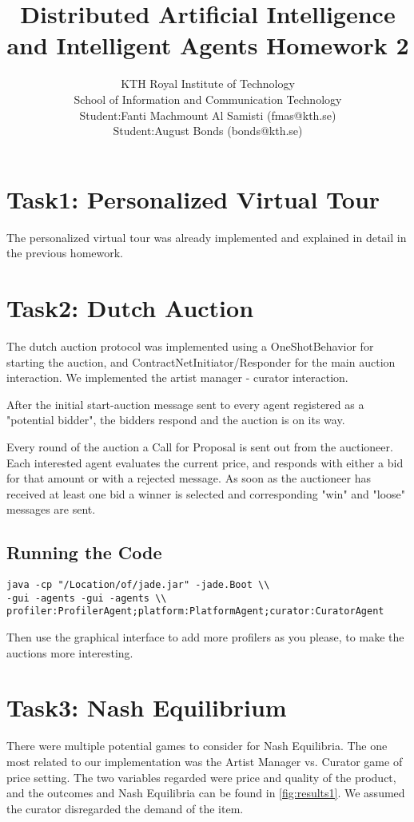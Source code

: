 \documentclass[a4paper, 11pt]{article}
\title{Distributed Artificial Intelligence and Intelligent Agents Homework 2}
\author{KTH Royal Institute of Technology \\ 
		School of Information and Communication Technology \\
		Student:Fanti Machmount Al Samisti (fmas@kth.se) \\
		Student:August Bonds (bonds@kth.se)}
\begin{document}
	
\maketitle

\section{Task1: Personalized Virtual Tour}

The personalized virtual tour was already implemented and explained in detail in the previous homework. 

\section{Task2: Dutch Auction}

The dutch auction protocol was implemented using a OneShotBehavior for starting the auction, and ContractNetInitiator/Responder for the main auction interaction. We implemented the artist manager - curator interaction.

After the initial start-auction message sent to every agent registered as a "potential bidder", the bidders respond and the auction is on its way.

Every round of the auction a Call for Proposal is sent out from the auctioneer. Each interested agent evaluates the current price, and responds with either a bid for that amount or with a rejected message. As soon as the auctioneer has received at least one bid a winner is selected and corresponding "win" and "loose" messages are sent.

\subsection{Running the Code}
\begin{verbatim}
java -cp "/Location/of/jade.jar" -jade.Boot \\
-gui -agents -gui -agents \\
profiler:ProfilerAgent;platform:PlatformAgent;curator:CuratorAgent
\end{verbatim}
Then use the graphical interface to add more profilers as you please, to make the auctions more interesting.

\section{Task3: Nash Equilibrium}
There were multiple potential games to consider for Nash Equilibria. The one most related to our implementation was the Artist Manager vs. Curator game of price setting. 
The two variables regarded were price and quality of the product, and the outcomes and Nash Equilibria can be found in \ref{fig:results1}. We assumed the curator disregarded the demand of the item.
\end{document}
